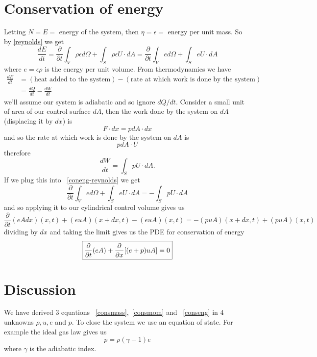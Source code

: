 \documentclass[12pt]{article}
\begin{document}
\section{Conservation of energy}
Letting $N = E = $ energy of the system, then $\eta = \epsilon = $ energy per unit mass. So by \eqref{reynolds} we get
\begin{equation}
\label{coneng-reynolds}
\frac{dE}{dt} = \frac{\partial}{\partial t}\int_{V}\rho \epsilon d\Omega + \int_{S}\rho \epsilon U\cdot dA
                       = \frac{\partial}{\partial t}\int_{V}ed\Omega + \int_{S}eU\cdot dA
\end{equation}
where $e = \epsilon\rho$ is the energy per unit volume. From thermodynamics we have
\begin{align*}
\frac{dE}{dt} &= (\text{heat added to the system}) - (\text{rate at which work is done by the system}) \\
                       &= \frac{dQ}{dt} - \frac{dW}{dt}
\end{align*}
we'll assume our system is adiabatic and so ignore $dQ/dt$. Consider a small unit of area of our control surface $dA$, then the work done by the system on $dA$ (displacing it by $dx$) is
$$
F\cdot dx = pdA\cdot dx
$$
and so the rate at which work is done by the system on $dA$ is
$$
pdA\cdot U
$$
therefore
$$
\frac{dW}{dt} = \int_SpU\cdot dA.
$$
If we plug this into ~\eqref{coneng-reynolds} we get
$$
\frac{\partial}{\partial t}\int_{V}ed\Omega + \int_{S}eU\cdot dA = -\int_S{pU\cdot dA}
$$
and so applying it to our cylindrical control volume gives us
$$
\frac{\partial}{\partial t}(eAdx)(x,t) + (euA)(x+dx,t) - (euA)(x,t) = -(puA)(x+dx,t) + (puA)(x,t)
$$
dividing by $dx$ and taking the limit gives us the PDE for conservation of energy
\begin{equation}
\boxed{
\label{conseng}
\frac{\partial}{\partial t}(eA) +  \frac{\partial}{\partial x}[(e+p)uA] = 0
}
\end{equation}

\section{Discussion}
We have derived 3 equations ~\eqref{consmass},~\eqref{consmom} and ~\eqref{conseng} in 4 unknowns $\rho,u,e$ and $p$. To close the system we use an equation of state. For example the ideal gas law gives us
$$
p=\rho(\gamma-1)e
$$
where $\gamma$ is the adiabatic index.
\end{document}
